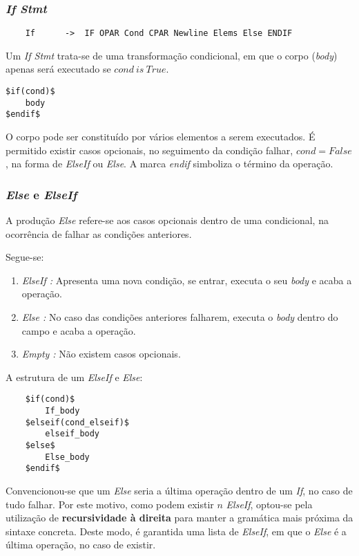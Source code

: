 \documentclass[../relatorio.tex]{subfiles}
\begin{document}
\subsubsection*{\textit{If Stmt}} \label{grm:ifstmt}
\begin{verbatim}
    If      ->  IF OPAR Cond CPAR Newline Elems Else ENDIF
\end{verbatim}
Um \textit{If Stmt} trata-se de uma transformação
condicional, em que o corpo (\textit{body}) apenas será executado
se $cond\ is\ True$.
\begin{verbatim}    
$if(cond)$
    body
$endif$
\end{verbatim}
O corpo pode ser constituído por vários elementos a serem executados.
É permitido existir casos opcionais, no seguimento da condição falhar, 
$cond=False$, na forma de \textit{ElseIf} ou \textit{Else}.
A marca \textit{endif} simboliza o término da operação.

\subsubsection{\textit{Else} e \textit{ElseIf}} \label{grm:else}
A produção \textit{Else} refere-se aos casos opcionais 
dentro de uma condicional, na ocorrência de falhar as
condições anteriores.

Segue-se:
\begin{enumerate}
    \item \textit{ElseIf :} Apresenta uma nova condição, se entrar, executa o seu \textit{body}
                            e acaba a operação.
    \item \textit{Else :} No caso das condições anteriores falharem, executa o \textit{body} dentro do campo
                          e acaba a operação.
    \item \textit{Empty :} Não existem casos opcionais.
\end{enumerate}

A estrutura de um \textit{ElseIf} e \textit{Else}:
\begin{verbatim}    
    $if(cond)$
        If_body
    $elseif(cond_elseif)$
        elseif_body
    $else$
        Else_body
    $endif$
\end{verbatim}

Convencionou-se que um \textit{Else} seria a última operação dentro de um \textit{If}, no 
caso de tudo falhar. 
Por este motivo, como podem existir $n$ \textit{ElseIf}, optou-se pela utilização 
de \textbf{recursividade à direita} para manter a gramática mais próxima da sintaxe concreta. 
Deste modo, é garantida uma lista de \textit{ElseIf}, em que o \textit{Else}
é a última operação, no caso de existir.
\end{document}
